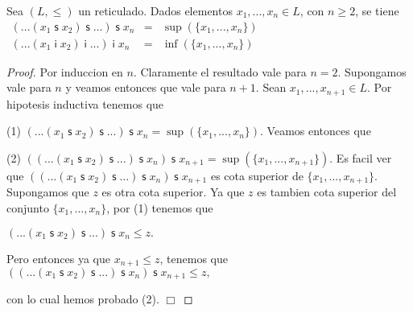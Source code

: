   \begin{lemma}
    Sea \((L,\leq )\) un reticulado. Dados elementos \(x_{1},...,x_{n}\in L\), con \( n\geq 2\), se tiene
    \(\displaystyle \begin{array}{rcl} (...(x_{1}\;\mathsf{s\;}x_{2})\;\mathsf{s\;}...)\;\mathsf{s\;}x_{n} & =& \sup (\{x_{1},...,x_{n}\}) \\ (...(x_{1}\mathsf{\;i\;}x_{2})\mathsf{\;i\;}...)\mathsf{\;i\;}x_{n} & =& \inf (\{x_{1},...,x_{n}\}) \end{array} \)
  \end{lemma}
  \begin{proof}
    Por induccion en \(n\). Claramente el resultado vale para \(n=2\). Supongamos vale para \(n\) y veamos entonces que vale para \(n+1\). Sean \( x_{1},...,x_{n+1}\in L\). Por hipotesis inductiva tenemos que

    (1) \((...(x_{1}\;\mathsf{s}\;x_{2})\;\mathsf{s\;}...)\;\mathsf{s\;} x_{n}=\sup (\{x_{1},...,x_{n}\}).\)
    Veamos entonces que

    (2) \(((...(x_{1}\;\mathsf{s\;}x_{2})\;\mathsf{s\;}...)\;\mathsf{s\;} x_{n})\;\mathsf{s\;}x_{n+1}=\sup (\{x_{1},...,x_{n+1}\}).\)
    Es facil ver que \(((...(x_{1}\;\mathsf{s\;}x_{2})\;\mathsf{s\;} ...)\;\mathsf{s\;}x_{n})\;\mathsf{s\;}x_{n+1}\) es cota superior de \( \{x_{1},...,x_{n+1}\}\). Supongamos que \(z\) es otra cota superior. Ya que \(z\) es tambien cota superior del conjunto \(\{x_{1},...,x_{n}\}\), por (1) tenemos que

    \(\displaystyle (...(x_{1}\;\mathsf{s\;}x_{2})\;\mathsf{s}\;...)\;\mathsf{s\;}x_{n}\leq z. \)

    Pero entonces ya que \(x_{n+1}\leq z\), tenemos que
    \(\displaystyle ((...(x_{1}\;\mathsf{s\;}x_{2})\;\mathsf{s\;}...)\;\mathsf{s\;}x_{n})\; \mathsf{s\;}x_{n+1}\leq z, \)

    con lo cual hemos probado (2). \(\Box\)
  \end{proof}

